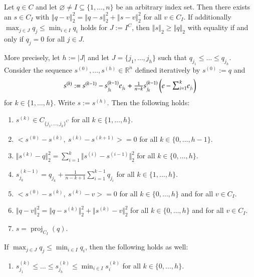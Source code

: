 \documentclass[twoside,11pt]{article}
\DeclareMathOperator{\proj}{proj}
\newcommand{\R}{\mathbb{R}}
\newcommand{\0}{\mathcal{O}}
\newcommand{\comp}{^C}
\newcommand{\norm}[1]{\left\Vert#1\right\Vert}
\newcommand{\bnorm}[1]{\big\Vert#1\big\Vert}
\newcommand{\abs}[1]{\left\vert #1 \right\vert}
\newcommand{\bscp}[2]{\big<#1,\ #2\big>}
\newcommand{\discint}[2]{\{#1,\dotsc,#2\}}
\newcommand{\inint}[2]{\in\discint{#1}{#2}}
\newcommand{\smallsum}{\scalebox{1.2}{$\sum$}}
\renewcommand{\emptyset}{\varnothing}
\begin{document}
\begin{lemma}
\label{lem:subsplx_proj}
Let $q\in C$ and let $\emptyset\neq I\subseteq\discint{1}{n}$ be an arbitrary index set.
Then there exists an $s\in C_I$ with $\norm{q - v}_2^2 = \norm{q - s}_2^2 + \norm{s - v}_2^2$ for all $v\in C_I$.
If additionally $\max_{j\in J}q_j \leq \min_{i\in I}q_i$ holds for $J := I\comp$, then $\norm{s}_2 \geq \norm{q}_2$ with equality if and only if $q_j = 0$ for all $j\in J$.

More precisely, let $h := \abs{J}$ and let $J = \discint{j_1}{j_h}$ such that $q_{j_1} \leq \dots \leq q_{j_h}$.
Consider the sequence $s^{(0)},\dotsc,s^{(h)}\in\R^n$ defined iteratively by $s^{(0)} := q$ and
\begin{displaymath}
  s^{(k)} := s^{(k-1)} - s_{j_k}^{(k-1)}e_{j_k} + \tfrac{1}{n - k}s_{j_k}^{(k-1)}\left(e - \smallsum_{i=1}^k e_{j_i}\right)
\end{displaymath}
for $k\inint{1}{h}$.
Write $s := s^{(h)}$.
Then the following holds:
\begin{enumerate}
\item \label{lem:subsplx_proj_a}
$s^{(k)} \in C_{\discint{j_1}{j_k}^C}$ for all $k\inint{1}{h}$.

\item \label{lem:subsplx_proj_b}
$\bscp{s^{(0)} - s^{(k)}}{s^{(k)} - s^{(k+1)}} = 0$ for all $k\inint{0}{h-1}$.

\item \label{lem:subsplx_proj_c}
$\bnorm{s^{(k)} - q}_2^2 = \sum_{i=1}^{k}\bnorm{s^{(i)} - s^{(i-1)}}_2^2$ for all $k\inint{0}{h}$.

\item \label{lem:subsplx_proj_d}
$s^{(k-1)}_{j_k} = q_{j_k} + \tfrac{1}{n - k + 1}\sum_{i=1}^{k-1}q_{j_i}$ for all $k\inint{1}{h}$.

\item \label{lem:subsplx_proj_e}
$\bscp{s^{(0)} - s^{(k)}}{s^{(k)} - v} = 0$ for all $k\inint{0}{h}$ and for all $v\in C_I$.

\item \label{lem:subsplx_proj_f}
$\norm{q - v}_2^2 = \bnorm{q - s^{(k)}}_2^2 + \bnorm{s^{(k)} - v}_2^2$ for all $k\inint{0}{h}$ and for all $v\in C_I$.

\item \label{lem:subsplx_proj_g}
$s = \proj_{C_I}(q)$.
\end{enumerate}

\vspace{2ex}
If $\max_{j\in J}q_j \leq \min_{i\in I}q_i$, then the following holds as well:
\begin{enumerate}[start=8]
\item \label{lem:subsplx_proj_h}
$s^{(k)}_{j_1} \leq \dots \leq s^{(k)}_{j_h} \leq \min_{i\in I} s^{(k)}_i$ for all $k\inint{0}{h}$.


\end{enumerate}
\end{lemma}
\end{document}
